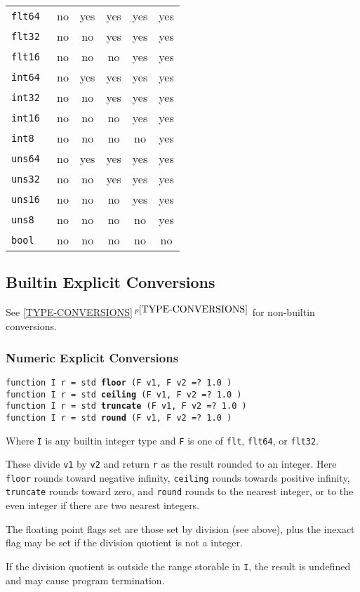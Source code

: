 \documentclass[12pt]{article}
\newcommand{\ttkey}[1]{{\tt \bfseries #1}}
\newcommand{\itemref}[1]{\ref{#1}$\,^{p\pageref{#1}}$}
\newenvironment{indpar}[1][0.3in]%
	{\begin{list}{}%
		     {\setlength{\itemsep}{0in}%
		      \setlength{\topsep}{0in}%
		      \setlength{\parsep}{1ex}%
		      \setlength{\labelwidth}{#1}%
		      \setlength{\leftmargin}{#1}%
		      \addtolength{\leftmargin}{\labelsep}}%
	 \item}%
	{\end{list}}
\begin{document}
\begin{center}
\begin{tabular}{l|c|c|c|c|c|}
\tt flt64 & no & yes & yes & yes & yes \\
\tt flt32 & no & no & yes & yes & yes \\
\tt flt16 & no & no & no & yes & yes
\\\hline
\tt int64 & no & yes & yes & yes & yes \\
\tt int32 & no & no & yes & yes & yes \\
\tt int16 & no & no & no & yes & yes \\
\tt int8 & no & no & no & no & yes
\\\hline
\tt uns64 & no & yes & yes & yes & yes \\
\tt uns32 & no & no & yes & yes & yes \\
\tt uns16 & no & no & no & yes & yes \\
\tt uns8 & no & no & no & no & yes
\\\hline
\tt bool & no & no & no & no & no
\\\hline
\end{tabular}
\end{center}

\subsection{Builtin Explicit Conversions}
\label{BUILTIN-EXPLICIT-CONVERSIONS}

See \itemref{TYPE-CONVERSIONS} for non-builtin conversions.

\subsubsection{Numeric Explicit Conversions}

{\tt function I r = std \ttkey{floor} (F v1, F v2 =? 1.0 )} \\
{\tt function I r = std \ttkey{ceiling} (F v1, F v2 =? 1.0 )} \\
{\tt function I r = std \ttkey{truncate} (F v1, F v2 =? 1.0 )} \\
{\tt function I r = std \ttkey{round} (F v1, F v2 =? 1.0 )}
\begin{indpar}
Where {\tt I} is any builtin integer type
and {\tt F} is one of {\tt flt}, {\tt flt64}, or {\tt flt32}.

These divide {\tt v1} by {\tt v2} and return {\tt r} as the
result rounded to an integer.
Here {\tt floor} rounds toward negative infinity, {\tt ceiling}
rounds towards positive infinity, {\tt truncate} rounds toward
zero, and {\tt round} rounds to the nearest integer, or to the
even integer if there are two nearest integers.

The floating point flags set are those set by division (see above), plus the
inexact flag may be set if the division quotient is not a integer.

If the division quotient is outside the range storable in {\tt I},
the result is undefined and may cause program termination.
\end{indpar}
\end{document}
